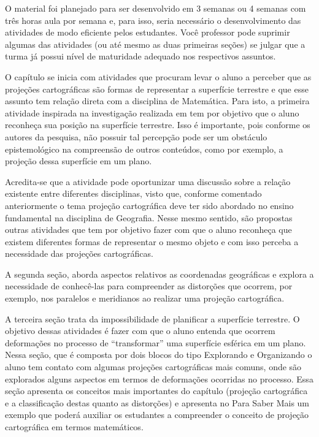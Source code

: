 \begin{apresentacao}
{O material foi planejado para ser desenvolvido em 3 semanas ou 4 semanas com três horas aula por semana e, para isso, seria necessário o desenvolvimento das atividades de modo eficiente pelos estudantes. Você  professor pode suprimir  algumas das atividades (ou até mesmo as duas primeiras seções) se julgar que a turma já possui nível de maturidade adequado nos respectivos assuntos.

O capítulo se inicia com atividades que procuram levar o aluno a perceber que as projeções cartográficas são formas de representar a superfície terrestre e que esse assunto tem relação direta com a disciplina de Matemática. Para isto, a primeira atividade inspirada na investigação realizada em \cite{Nussbaum} tem por objetivo que o aluno reconheça sua posição na superfície terrestre. Isso é importante, pois conforme os autores da pesquisa, não possuir tal percepção pode ser um obstáculo epistemológico na compreensão de outros conteúdos, como por exemplo, a projeção dessa superfície em um plano. 

Acredita-se que a atividade pode oportunizar uma discussão sobre a relação existente entre diferentes disciplinas, visto que, conforme comentado anteriormente o tema projeção cartográfica deve ter sido abordado no ensino fundamental na disciplina de Geografia. Nesse mesmo sentido, são propostas outras atividades que tem por objetivo fazer com que o aluno  reconheça que existem diferentes formas de representar o mesmo objeto e com isso perceba a necessidade das projeções cartográficas. 

A segunda seção, aborda aspectos relativos as coordenadas geográficas e explora a necessidade de conhecê-las para compreender as distorções que ocorrem, por exemplo, nos paralelos e meridianos ao realizar uma  projeção cartográfica.

A terceira seção trata da impossibilidade de planificar a superfície terrestre. O objetivo dessas atividades é fazer com que o aluno entenda que ocorrem deformações no processo de “transformar” uma superfície esférica em um plano. Nessa seção, que é composta por dois blocos do tipo Explorando e Organizando o aluno tem contato com algumas projeções cartográficas mais comuns, onde são explorados alguns aspectos em termos de deformações ocorridas no processo. Essa seção apresenta os conceitos mais  importantes do capítulo (projeção cartográfica e a classificação destas quanto as distorções) e apresenta no Para Saber Mais um exemplo que poderá auxiliar os estudantes a compreender o conceito de projeção cartográfica em termos matemáticos. 

}
\end{apresentacao}
